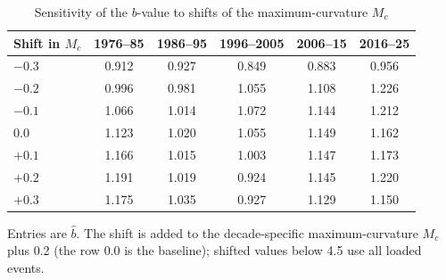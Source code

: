 \begin{table}[t]
\centering
\begin{threeparttable}
\caption{Sensitivity of the $b$-value to shifts of the maximum-curvature $M_c$}
\label{tab:mc_shift}
\begin{tabular}{lccccc}
\toprule
Shift in $M_c$ & 1976--85 & 1986--95 & 1996--2005 & 2006--15 & 2016--25 \\
\midrule
$-0.3$ & 0.912 & 0.927 & 0.849 & 0.883 & 0.956 \\
$-0.2$ & 0.996 & 0.981 & 1.055 & 1.108 & 1.226 \\
$-0.1$ & 1.066 & 1.014 & 1.072 & 1.144 & 1.212 \\
$0.0$ & 1.123 & 1.020 & 1.055 & 1.149 & 1.162 \\
$+0.1$ & 1.166 & 1.015 & 1.003 & 1.147 & 1.173 \\
$+0.2$ & 1.191 & 1.019 & 0.924 & 1.145 & 1.220 \\
$+0.3$ & 1.175 & 1.035 & 0.927 & 1.129 & 1.150 \\
\bottomrule
\end{tabular}
\begin{tablenotes}[flushleft]
\footnotesize
\item Entries are $\hat b$. The shift is added to the decade-specific maximum-curvature $M_c$ plus 0.2 (the row $0.0$ is the baseline); shifted values below 4.5 use all loaded events.
\end{tablenotes}
\end{threeparttable}
\end{table}
